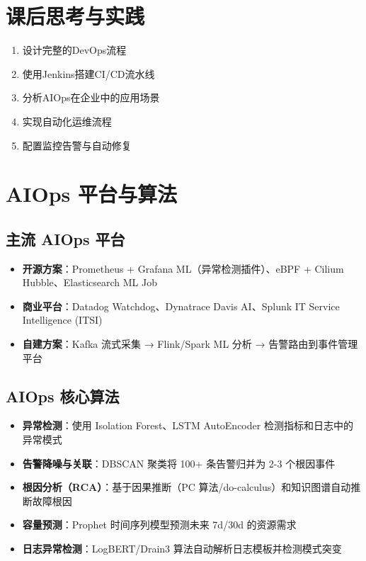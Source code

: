 \documentclass[12pt,UTF8]{ctexbook}
\begin{document}
\section{课后思考与实践}
\label{sec:devops-aiops-practice}
\begin{enumerate}
    \item 设计完整的DevOps流程
    \item 使用Jenkins搭建CI/CD流水线
    \item 分析AIOps在企业中的应用场景
    \item 实现自动化运维流程
    \item 配置监控告警与自动修复
\end{enumerate}

\section{AIOps 平台与算法}
\label{sec:aiops-platforms}

\subsection{主流 AIOps 平台}

\begin{itemize}
    \item \textbf{开源方案}：Prometheus + Grafana ML（异常检测插件）、eBPF + Cilium Hubble、Elasticsearch ML Job
    \item \textbf{商业平台}：Datadog Watchdog、Dynatrace Davis AI、Splunk IT Service Intelligence (ITSI)
    \item \textbf{自建方案}：Kafka 流式采集 → Flink/Spark ML 分析 → 告警路由到事件管理平台
\end{itemize}

\subsection{AIOps 核心算法}

\begin{itemize}
    \item \textbf{异常检测}：使用 Isolation Forest、LSTM AutoEncoder 检测指标和日志中的异常模式
    \item \textbf{告警降噪与关联}：DBSCAN 聚类将 100+ 条告警归并为 2-3 个根因事件
    \item \textbf{根因分析（RCA）}：基于因果推断（PC 算法/do-calculus）和知识图谱自动推断故障根因
    \item \textbf{容量预测}：Prophet 时间序列模型预测未来 7d/30d 的资源需求
    \item \textbf{日志异常检测}：LogBERT/Drain3 算法自动解析日志模板并检测模式突变
\end{itemize}
\end{document}
